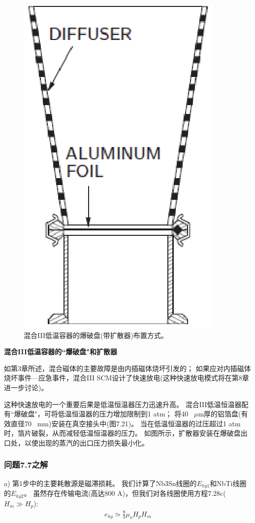 \begin{figure}[htbp]
	\centering
	\includegraphics[scale=0.7]{chpt7/figs/fig7.21.eps}
	\caption{混合III低温容器的爆破盘(带扩散器)布置方式。}
\end{figure}

\textbf{混合III低温容器的``爆破盘"和扩散器}

如第3章所述，混合磁体的主要故障是由内插磁体烧坏引发的；
如果应对内插磁体烧坏事件---应急事件，混合III SCM设计了快速放电(这种快速放电模式将在第8章进一步讨论)。

这种快速放电的一个重要后果是低温恒温器压力迅速升高。
混合III低温恒温器配有``爆破盘"，可将低温恒温器的压力增加限制到1 atm；
将40~ $\mu$m厚的铝箔盘(有效直径70~ mm)安装在真空接头中(图7.21)。
当在低温恒温器的过压超过1 atm时，箔片破裂，从而减轻低温恒温器的压力。
如图所示，扩散器安装在爆破盘出口处，以使出现的蒸汽的出口压力损失最小化。

\subsubsection{问题7.7之解}
a) 第1步中的主要耗散源是磁滞损耗。 
我们计算了Nb3Sn线圈的$E_{hy1}$和NbTi线圈的$E_{hy2}$。
 虽然存在传输电流(高达800 A)，但我们对各线圈使用方程7.28c($H_m\gg H_p$):
\begin{align*}%
e_{hy}\simeq\frac{8}{3}\mu_oH_pH_m \tag{7.28c}
\end{align*}

